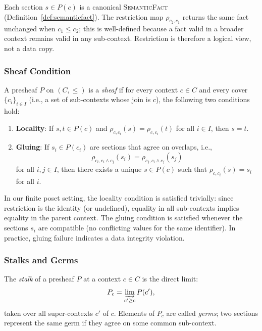 Each section \(s \in P(c)\) is a canonical \textsc{SemanticFact} (Definition~\ref{def:semanticfact}).
The restriction map \(\rho_{c_2,c_1}\) returns the same fact unchanged when
\(c_1 \leq c_2\); this is well-defined because a fact valid in a broader context
remains valid in any sub-context.  Restriction is therefore a logical view,
not a data copy.

\subsubsection{Sheaf Condition}
\label{sec:sheaf}

\begin{definition}[Sheaf]
\label{def:sheaf}
A presheaf \(P\) on \((C, \leq)\) is a \emph{sheaf} if for every context
\(c \in C\) and every cover \(\{c_i\}_{i \in I}\) (i.e., a set of sub-contexts
whose join is \(c\)), the following two conditions hold:
\begin{enumerate}
    \item \textbf{Locality}: If \(s, t \in P(c)\) and
          \(\rho_{c,c_i}(s) = \rho_{c,c_i}(t)\) for all \(i \in I\),
          then \(s = t\).
    \item \textbf{Gluing}: If \(s_i \in P(c_i)\) are sections that agree on
          overlaps, i.e.,
          \[
          \rho_{c_i,c_i \land c_j}(s_i) = \rho_{c_j,c_i \land c_j}(s_j)
          \]
          for all \(i, j \in I\), then there exists a unique
          \(s \in P(c)\) such that \(\rho_{c,c_i}(s) = s_i\) for all \(i\).
\end{enumerate}
\end{definition}

In our finite poset setting, the locality condition is satisfied trivially:
since restriction is the identity (or undefined), equality in all sub-contexts
implies equality in the parent context.  The gluing condition is satisfied
whenever the sections \(s_i\) are compatible (no conflicting values for the
same identifier).  In practice, gluing failure indicates a data integrity
violation.

\subsubsection{Stalks and Germs}
\label{sec:stalks}

\begin{definition}[Stalk]
\label{def:stalk-general}
The \emph{stalk} of a presheaf \(P\) at a context \(c \in C\) is the
direct limit:
\[
P_c = \varinjlim_{c' \geq c} P(c'),
\]
taken over all super-contexts \(c'\) of \(c\).  Elements of \(P_c\) are
called \emph{germs}; two sections represent the same germ if they agree on
some common sub-context.
\end{definition}

